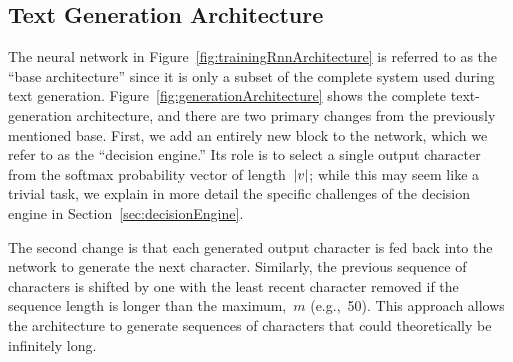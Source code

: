 \documentclass{article}
\DeclarePairedDelimiter\abs{\lvert}{\rvert}%
\begin{document}
\subsection{Text Generation Architecture}\label{sec:generationRnnArchitecture}

The neural network in Figure~\ref{fig:trainingRnnArchitecture} is referred to as the ``base architecture'' since it is only a subset of the complete system used during text generation.  Figure~\ref{fig:generationArchitecture} shows the complete text-generation architecture, and there are two primary changes from the previously mentioned base.  First, we add an entirely new block to the network, which we refer to as the ``decision engine.''  Its role is to select a single output character from the softmax probability vector of length~$\abs*{v}$; while this may seem like a trivial task, we explain in more detail the specific challenges of the decision engine in Section~\ref{sec:decisionEngine}. 

The second change is that each generated output character is fed back into the network to generate the next character.  Similarly, the previous sequence of characters is shifted by one with the least recent character removed if the sequence length is longer than the maximum,~$m$ (e.g.,~50).  This approach allows the architecture to generate sequences of characters that could theoretically be infinitely long.
\end{document}
